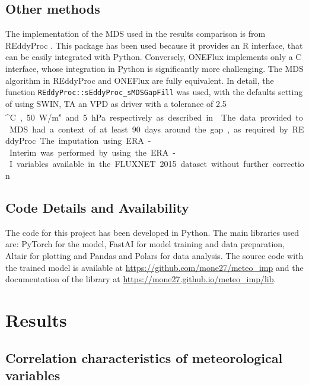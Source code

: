 \documentclass{article}
\let\Oldsection\section
\renewcommand{\section}{\FloatBarrier\Oldsection}
\let\Oldsubsection\subsection
\renewcommand{\subsection}{\FloatBarrier\Oldsubsection}
\begin{document}
\subsection{Other methods}

The implementation of the MDS used in the results comparison is from \textsf{REddyProc} \cite{wutzler_basic_2018}. This package has been used because it provides an R interface, that can be easily integrated with Python. Conversely, \textsf{ONEFlux} implements only a C interface, whose integration in Python is significantly more challenging.  The MDS algorithm in \textsf{REddyProc} and \textsf{ONEFlux} are fully equivalent. In detail, the function \verb|REddyProc::sEddyProc_sMDSGapFill| was used, with the defaults setting of using SW\textunderscore IN, TA an VPD as driver with a tolerance of 2.5 \si{^\circ C}, 50 \si{W/m^s} and 5 \si{hPa} respectively as described in \textcite{reichstein_separation_2005-3}.
The data provided to MDS had a context of at least 90 days around the gap, as required by \textsf{REddyProc}. 

The imputation using ERA-Interim was performed by using the ERA-I variables available in the FLUXNET 2015 dataset without further correction.

\subsection{Code Details and Availability}

The code for this project has been developed in Python. The main libraries used are: \textsf{PyTorch} \cite{NEURIPS2019_9015} for the model,  \textsf{FastAI} \cite{howard_fastai_2020} for model training and data preparation, \textsf{Altair} \cite{VanderPlas2018,Satyanarayan2017} for plotting and \textsf{Pandas} and \textsf{Polars} for data analysis. The source code with the trained model is available at \url{https://github.com/mone27/meteo_imp} and the documentation of the library at \url{https://mone27.github.io/meteo_imp/lib}.

\section{Results}

\subsection{Correlation characteristics of meteorological variables}
\end{document}
